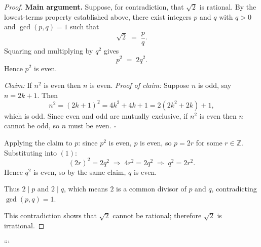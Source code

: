 \begin{proof}
\medskip
\noindent\textbf{Main argument.}
Suppose, for contradiction, that $\sqrt{2}$ is rational. By the lowest-terms property established above, there exist integers $p$ and $q$ with $q>0$ and $\gcd(p,q)=1$ such that
\[
\sqrt{2} \;=\; \frac{p}{q}.
\]
Squaring and multiplying by $q^2$ gives
\[
p^2 \;=\; 2q^2. \tag{1}
\]
Hence $p^2$ is even.

\emph{Claim:} If $n^2$ is even then $n$ is even. \emph{Proof of claim:} Suppose $n$ is odd, say $n=2k+1$. Then
\[
n^2 = (2k+1)^2 = 4k^2+4k+1 = 2(2k^2+2k)+1,
\]
which is odd. Since even and odd are mutually exclusive, if $n^2$ is even then $n$ cannot be odd, so $n$ must be even. $\square$

Applying the claim to $p$: since $p^2$ is even, $p$ is even, so $p=2r$ for some $r\in\mathbb{Z}$. Substituting into $(1)$:
\[
(2r)^2 = 2q^2 \;\Longrightarrow\; 4r^2 = 2q^2 \;\Longrightarrow\; q^2 = 2r^2.
\]
Hence $q^2$ is even, so by the same claim, $q$ is even.

Thus $2\mid p$ and $2\mid q$, which means $2$ is a common divisor of $p$ and $q$, contradicting $\gcd(p,q)=1$.

This contradiction shows that $\sqrt{2}$ cannot be rational; therefore $\sqrt{2}$ is irrational.
\end{proof}
```
